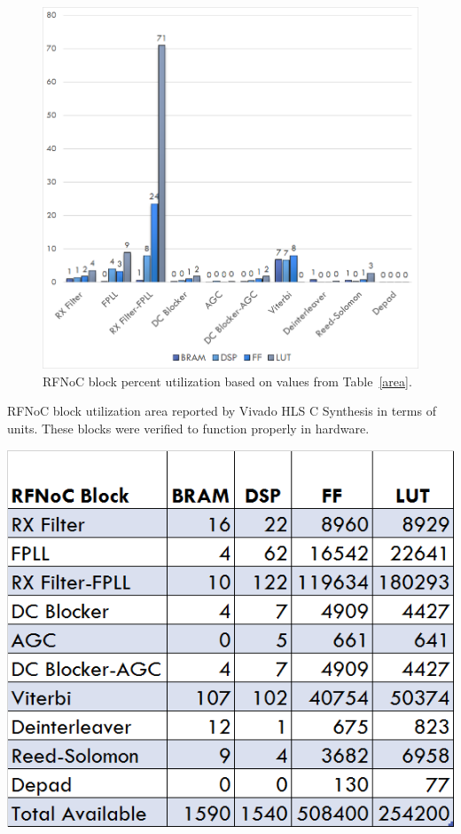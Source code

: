 \documentclass{article}
\begin{document}
\begin{figure}[h]
  \begin{center}
    \centerline{\includegraphics[width=\columnwidth]{percentarea.png}}
    \caption{RFNoC block percent utilization based on values from Table~\ref{area}.}
    \label{percentarea}
  \end{center}
\end{figure}

\begin{table}[h]
  \begin{center}
    \caption{RFNoC block utilization area reported by Vivado HLS C Synthesis in terms of units. These blocks were verified to function properly in hardware.\\
    }
    \centerline{\includegraphics[width=\columnwidth]{area.png}}
    \label{area}
  \end{center}
\end{table}
\end{document}
